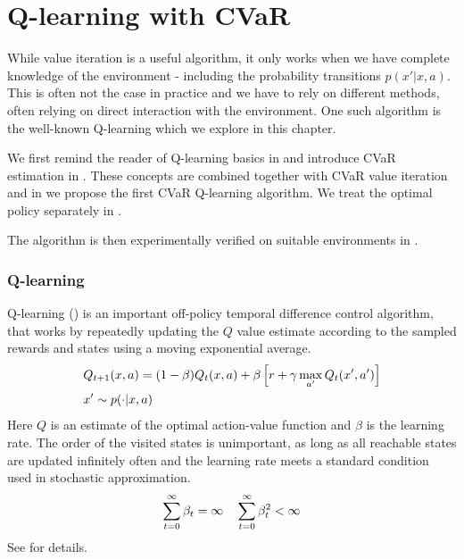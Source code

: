 \chapter{Q-learning with CVaR}\label{ch:qlearning}

While value iteration is a useful algorithm, it only works when we have complete knowledge of the environment - including the probability transitions $p(x'|x,a)$. This is often not the case in practice and we have to rely on different methods, often relying on direct interaction with the environment. One such algorithm is the well-known Q-learning which we explore in this chapter.

We first remind the reader of Q-learning basics in  and introduce CVaR estimation in . These concepts are combined together with CVaR value iteration and in  we propose the first CVaR Q-learning algorithm. We treat the optimal policy separately in .

The algorithm is then experimentally verified on suitable environments in .

\subsection{Q-learning}\label{sec:qlearning}

Q-learning (\citet{watkins1992q}) is an important off-policy temporal difference control algorithm, that works by repeatedly updating the $Q$ value estimate according to the sampled rewards and states using a moving exponential average.
\begin{equation}
\begin{split}
&Q_{t+1}(x, a) = (1-\beta)Q_{t}(x, a) + \beta\left[ {r + \gamma \max_{a'} Q_t(x', a')} \right]\\
&x' \sim p(\cdot|x, a)
\end{split}
\end{equation}
Here $Q$ is an estimate of the optimal action-value function  and $\beta$ is the learning rate. The order of the visited states is unimportant, as long as all reachable states are updated infinitely often and the learning rate meets a standard condition used in stochastic approximation.
\begin{equation}\label{eqn:beta}
\sum_{t=0}^\infty \beta_t = \infty  \quad \sum_{t=0}^\infty \beta_t^2 < \infty\\
\end{equation}
See \citet{jaakkola1994convergence} for details.

